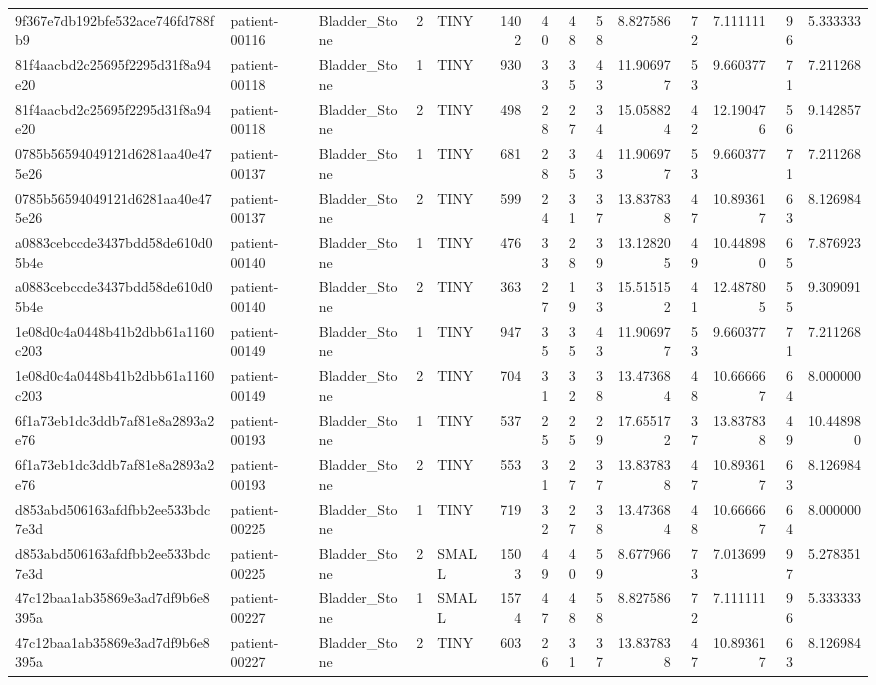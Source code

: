\begin{tabular}{lllrlrrrrrrrrr}
9f367e7db192bfe532ace746fd788fb9 & patient-00116 & Bladder_Stone & 2 & TINY & 1402 & 40 & 48 & 58 & 8.827586 & 72 & 7.111111 & 96 & 5.333333 \\
81f4aacbd2c25695f2295d31f8a94e20 & patient-00118 & Bladder_Stone & 1 & TINY & 930 & 33 & 35 & 43 & 11.906977 & 53 & 9.660377 & 71 & 7.211268 \\
81f4aacbd2c25695f2295d31f8a94e20 & patient-00118 & Bladder_Stone & 2 & TINY & 498 & 28 & 27 & 34 & 15.058824 & 42 & 12.190476 & 56 & 9.142857 \\
0785b56594049121d6281aa40e475e26 & patient-00137 & Bladder_Stone & 1 & TINY & 681 & 28 & 35 & 43 & 11.906977 & 53 & 9.660377 & 71 & 7.211268 \\
0785b56594049121d6281aa40e475e26 & patient-00137 & Bladder_Stone & 2 & TINY & 599 & 24 & 31 & 37 & 13.837838 & 47 & 10.893617 & 63 & 8.126984 \\
a0883cebccde3437bdd58de610d05b4e & patient-00140 & Bladder_Stone & 1 & TINY & 476 & 33 & 28 & 39 & 13.128205 & 49 & 10.448980 & 65 & 7.876923 \\
a0883cebccde3437bdd58de610d05b4e & patient-00140 & Bladder_Stone & 2 & TINY & 363 & 27 & 19 & 33 & 15.515152 & 41 & 12.487805 & 55 & 9.309091 \\
1e08d0c4a0448b41b2dbb61a1160c203 & patient-00149 & Bladder_Stone & 1 & TINY & 947 & 35 & 35 & 43 & 11.906977 & 53 & 9.660377 & 71 & 7.211268 \\
1e08d0c4a0448b41b2dbb61a1160c203 & patient-00149 & Bladder_Stone & 2 & TINY & 704 & 31 & 32 & 38 & 13.473684 & 48 & 10.666667 & 64 & 8.000000 \\
6f1a73eb1dc3ddb7af81e8a2893a2e76 & patient-00193 & Bladder_Stone & 1 & TINY & 537 & 25 & 25 & 29 & 17.655172 & 37 & 13.837838 & 49 & 10.448980 \\
6f1a73eb1dc3ddb7af81e8a2893a2e76 & patient-00193 & Bladder_Stone & 2 & TINY & 553 & 31 & 27 & 37 & 13.837838 & 47 & 10.893617 & 63 & 8.126984 \\
d853abd506163afdfbb2ee533bdc7e3d & patient-00225 & Bladder_Stone & 1 & TINY & 719 & 32 & 27 & 38 & 13.473684 & 48 & 10.666667 & 64 & 8.000000 \\
d853abd506163afdfbb2ee533bdc7e3d & patient-00225 & Bladder_Stone & 2 & SMALL & 1503 & 49 & 40 & 59 & 8.677966 & 73 & 7.013699 & 97 & 5.278351 \\
47c12baa1ab35869e3ad7df9b6e8395a & patient-00227 & Bladder_Stone & 1 & SMALL & 1574 & 47 & 48 & 58 & 8.827586 & 72 & 7.111111 & 96 & 5.333333 \\
47c12baa1ab35869e3ad7df9b6e8395a & patient-00227 & Bladder_Stone & 2 & TINY & 603 & 26 & 31 & 37 & 13.837838 & 47 & 10.893617 & 63 & 8.126984 \\

\end{tabular}
